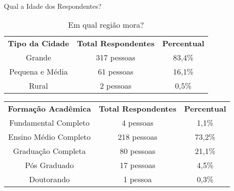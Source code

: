 \begin{apendicesenv}
\begin{table}[ht]
    \caption{Qual a Idade dos Respondentes?}
    \label{tab:idade}
\end{table}

\begin{table}[ht]
    \centering
    \setlength{\extrarowheight}{3pt}  %

    \begin{center}
        \begin{minipage}{\textwidth}
            \centering
            \begin{tabular}{|c|c|c|}
                \textbf{Tipo da Cidade} & \textbf{Total Respondentes} & \textbf{Percentual} \\
                Grande & 317 pessoas & 83,4\% \\
                Pequena e Média & 61 pessoas & 16,1\% \\
                Rural & 2 pessoas & 0,5\% \\
            \end{tabular}
        \end{minipage}
    \end{center}

    \caption{Em qual região mora?}
    \label{tab:regiao}
\end{table}

\begin{table}[ht]
    \centering
    \setlength{\extrarowheight}{3pt}  %

    \begin{center}
        \begin{minipage}{\textwidth}
            \centering
            \begin{tabular}{|c|c|c|}
                \textbf{Formação Acadêmica} & \textbf{Total Respondentes} & \textbf{Percentual} \\
                Fundamental Completo & 4 pessoas & 1,1\% \\
                Ensino Médio Completo & 218 pessoas & 73,2\% \\
                Graduação Completa & 80 pessoas & 21,1\% \\
                Pós Graduado & 17 pessoas & 4,5\% \\
                Doutorando & 1 pessoa & 0,3\% \\
            \end{tabular}
        \end{minipage}
    \end{center}


\end{table}
\end{apendicesenv}
